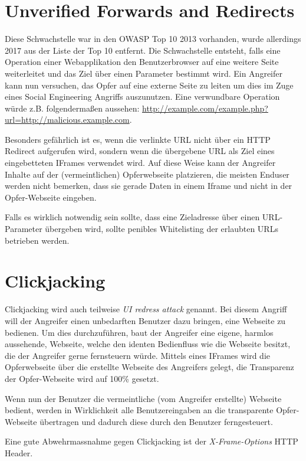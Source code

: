 \section{Unverified Forwards and Redirects}

Diese Schwachstelle war in den OWASP Top 10 2013 vorhanden, wurde allerdings 2017 aus der Liste der Top 10 entfernt. Die Schwachstelle entsteht, falls eine Operation einer Webapplikation den Benutzerbrowser auf eine weitere Seite weiterleitet und das Ziel über einen Parameter bestimmt wird. Ein Angreifer kann nun versuchen, das Opfer auf eine externe Seite zu leiten um dies im Zuge eines Social Engineering Angriffs auszunutzen. Eine verwundbare Operation würde z.B. folgendermaßen aussehen: \url{http://example.com/example.php?url=http://malicious.example.com}.

Besonders gefährlich ist es, wenn die verlinkte URL nicht über ein HTTP Redirect aufgerufen wird, sondern wenn die übergebene URL als Ziel eines eingebetteten IFrames verwendet wird. Auf diese Weise kann der Angreifer Inhalte auf der (vermeintlichen) Opferwebseite platzieren, die meisten Enduser werden nicht bemerken, dass sie gerade Daten in einem Iframe und nicht in der Opfer-Webseite eingeben.

Falls es wirklich notwendig sein sollte, dass eine Zieladresse über einen URL-Parameter übergeben wird, sollte penibles Whitelisting der erlaubten URLs betrieben werden.

\section{Clickjacking}

Clickjacking wird auch teilweise \textit{UI redress attack} genannt. Bei diesem Angriff will der Angreifer einen unbedarften Benutzer dazu bringen, eine Webseite zu bedienen. Um dies durchzuführen, baut der Angreifer eine eigene, harmlos aussehende, Webseite, welche den identen Bedienfluss wie die Webseite besitzt, die der Angreifer gerne fernsteuern würde. Mittels eines IFrames wird die Opferwebseite über die erstellte Webseite des Angreifers gelegt, die Transparenz der Opfer-Webseite wird auf 100\% gesetzt.

Wenn nun der Benutzer die vermeintliche (vom Angreifer erstellte) Webseite bedient, werden in Wirklichkeit alle Benutzereingaben an die transparente Opfer-Webseite übertragen und dadurch diese durch den Benutzer ferngesteuert.

Eine gute Abwehrmassnahme gegen Clickjacking ist der \textit{X-Frame-Options} HTTP Header.

